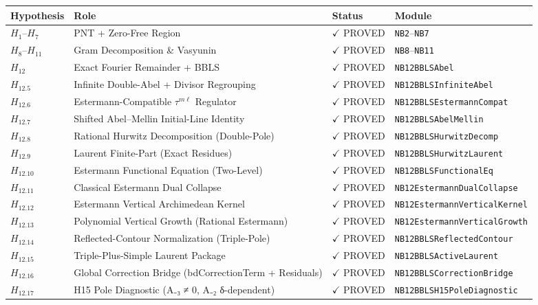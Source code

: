 \documentclass[11pt,a4paper]{article}
\theoremstyle{plain}
\theoremstyle{definition}
\theoremstyle{remark}
\begin{document}
\begin{table}[htbp]
\centering
\small
\begin{tabular}{llll}
\toprule
\textbf{Hypothesis} & \textbf{Role} & \textbf{Status} & \textbf{Module} \\
\midrule
$H_1$--$H_7$ & PNT + Zero-Free Region & $\checkmark$ PROVED & \texttt{NB2}--\texttt{NB7} \\
$H_8$--$H_{11}$ & Gram Decomposition \& Vasyunin & $\checkmark$ PROVED & \texttt{NB8}--\texttt{NB11} \\
$H_{12}$ & Exact Fourier Remainder + BBLS & $\checkmark$ PROVED & \texttt{NB12BBLSAbel} \\
$H_{12.5}$ & Infinite Double-Abel + Divisor Regrouping & $\checkmark$ PROVED & \texttt{NB12BBLSInfiniteAbel} \\
$H_{12.6}$ & Estermann-Compatible $\tau^{m\ell}$ Regulator & $\checkmark$ PROVED & \texttt{NB12BBLSEstermannCompat} \\
$H_{12.7}$ & Shifted Abel--Mellin Initial-Line Identity & $\checkmark$ PROVED & \texttt{NB12BBLSAbelMellin} \\
$H_{12.8}$ & Rational Hurwitz Decomposition (Double-Pole) & $\checkmark$ PROVED & \texttt{NB12BBLSHurwitzDecomp} \\
$H_{12.9}$ & Laurent Finite-Part (Exact Residues) & $\checkmark$ PROVED & \texttt{NB12BBLSHurwitzLaurent} \\
$H_{12.10}$ & Estermann Functional Equation (Two-Level) & $\checkmark$ PROVED & \texttt{NB12BBLSFunctionalEq} \\
$H_{12.11}$ & Classical Estermann Dual Collapse & $\checkmark$ PROVED & \texttt{NB12EstermannDualCollapse} \\
$H_{12.12}$ & Estermann Vertical Archimedean Kernel & $\checkmark$ PROVED & \texttt{NB12EstermannVerticalKernel} \\
$H_{12.13}$ & Polynomial Vertical Growth (Rational Estermann) & $\checkmark$ PROVED & \texttt{NB12EstermannVerticalGrowth} \\
$H_{12.14}$ & Reflected-Contour Normalization (Triple-Pole) & $\checkmark$ PROVED & \texttt{NB12BBLSReflectedContour} \\
$H_{12.15}$ & Triple-Plus-Simple Laurent Package & $\checkmark$ PROVED & \texttt{NB12BBLSActiveLaurent} \\
$H_{12.16}$ & Global Correction Bridge (bdCorrectionTerm + Residuals) & $\checkmark$ PROVED & \texttt{NB12BBLSCorrectionBridge} \\
$H_{12.17}$ & H15 Pole Diagnostic (A₋₃ ≠ 0, A₋₂ δ-dependent) & $\checkmark$ PROVED & \texttt{NB12BBLSH15PoleDiagnostic} \\

\end{tabular}
\end{table}
\end{document}
